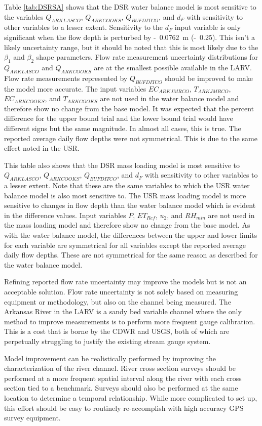 \begin{linenumbers}
Table \ref{tab:DSRSA} shows that the DSR water balance model is most sensitive to the variables $ Q_{ARKLASCO} $, $ Q_{ARKCOOKS} $, $ Q_{BUFDITCO} $, and $ d_F $ with sensitivity to other variables to a lesser extent.  Sensitivity to the $ d_F $ input variable is only significant when the flow depth is perturbed by \SI{0.0762}[-]{\meter} (\SI{0.25}[-]{\foot}).  This isn't a likely uncertainty range, but it should be noted that this is most likely due to the $ \beta_1 $ and $ \beta_2 $ shape parameters.  Flow rate measurement uncertainty distributions for $ Q_{ARKLASCO} $ and $ Q_{ARKCOOKS} $ are at the smallest possible available in the LARV.  Flow rate measurements represented by $ Q_{BUFDITCO} $ should be improved to make the model more accurate.  The input variables $ EC_{ARKJMRCO} $, $ T_{ARKJMRCO} $, $ EC_{ARKCOOKS} $, and $ T_{ARKCOOKS} $ are not used in the water balance model and therefore show no change from the base model.  It was expected that the percent difference for the upper bound trial and the lower bound trial would have different signs but the same magnitude.  In almost all cases, this is true.  The reported average daily flow depths were not symmetrical.  This is due to the same effect noted in the USR.

This table also shows that the DSR mass loading model is most sensitive to $ Q_{ARKLASCO} $, $ Q_{ARKCOOKS} $, $ Q_{BUFDITCO} $, and $ d_F $ with sensitivity to other variables to a lesser extent.  Note that these are the same variables to which the USR water balance model is also most sensitive to.  The USR mass loading model is more sensitive to changes in flow depth than the water balance model which is evident in the difference values.  Input variables $ P $, $ ET_{Ref} $, $ u_2 $, and $ RH_{min} $ are not used in the mass loading model and therefore show no change from the base model.  As with the water balance model, the differences between the upper and lower limits for each variable are symmetrical for all variables except the reported average daily flow depths.  These are not symmetrical for the same reason as described for the water balance model.

Refining reported flow rate uncertainty may improve the models but is not an acceptable solution.  Flow rate uncertainty is not solely based on measuring equipment or methodology, but also on the channel being measured.  The Arkansas River in the LARV is a sandy bed variable channel where the only method to improve measurements is to perform more frequent gauge calibration.  This is a cost that is borne by the CDWR and USGS, both of which are perpetually struggling to justify the existing stream gauge system.

Model improvement can be realistically performed by improving the characterization of the river channel.  River cross section surveys should be performed at a more frequent spatial interval along the river with each cross section tied to a benchmark.  Surveys should also be performed at the same location to determine a temporal relationship.  While more complicated to set up, this effort should be easy to routinely re-accomplish with high accuracy GPS survey equipment.

\clearpage{}
\end{linenumbers}